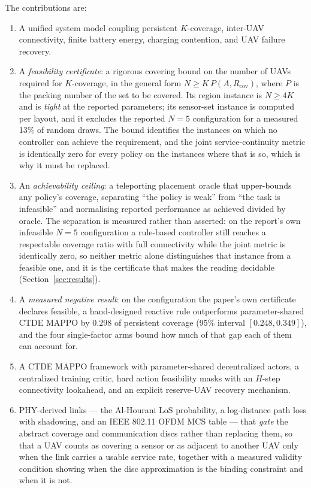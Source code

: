 \documentclass[conference]{IEEEtran}
\newcommand{\tokGap}{0.298}
\newcommand{\tokGapCi}{[0.248, 0.349]}
\begin{document}
The contributions are:
\begin{enumerate}
    \item A unified system model coupling persistent $K$-coverage, inter-UAV connectivity, finite battery energy, charging contention, and UAV failure recovery.
    \item A \emph{feasibility certificate}: a rigorous covering bound on the number of UAVs required for $K$-coverage, in the general form $N \ge K\,P(A,R_{\mathrm{cov}})$, where $P$ is the packing number of the set to be covered.  Its region instance is $N \ge 4K$ and is \emph{tight} at the reported parameters; its sensor-set instance is computed per layout, and it excludes the reported $N=5$ configuration for a measured 13\% of random draws.  The bound identifies the instances on which no controller can achieve the requirement, and the joint service-continuity metric is identically zero for every policy on the instances where that is so, which is why it must be replaced.
    \item An \emph{achievability ceiling}: a teleporting placement oracle that upper-bounds any policy's coverage, separating ``the policy is weak'' from ``the task is infeasible'' and normalising reported performance as achieved divided by oracle.  The separation is measured rather than asserted: on the report's own infeasible $N=5$ configuration a rule-based controller still reaches a respectable coverage ratio with full connectivity while the joint metric is identically zero, so neither metric alone distinguishes that instance from a feasible one, and it is the certificate that makes the reading decidable (Section~\ref{sec:results}).
    \item A \emph{measured negative result}: on the configuration the paper's own certificate declares feasible, a hand-designed reactive rule outperforms parameter-shared CTDE MAPPO by $\tokGap$ of persistent coverage (95\% interval $\tokGapCi$), and the four single-factor arms bound how much of that gap each of them can account for.
    \item A CTDE MAPPO framework with parameter-shared decentralized actors, a centralized training critic, hard action feasibility masks with an $H$-step connectivity lookahead, and an explicit reserve-UAV recovery mechanism.
    \item PHY-derived links --- the Al-Hourani LoS probability, a log-distance path loss with shadowing, and an IEEE 802.11 OFDM MCS table --- that \emph{gate} the abstract coverage and communication discs rather than replacing them, so that a UAV counts as covering a sensor or as adjacent to another UAV only when the link carries a usable service rate, together with a measured validity condition showing when the disc approximation is the binding constraint and when it is not.

\end{enumerate}
\end{document}
